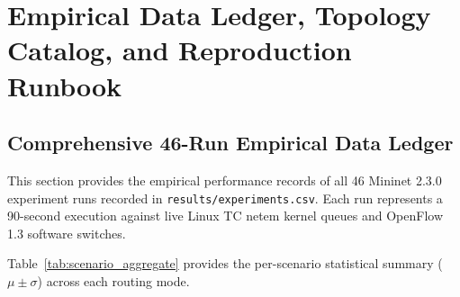 \chapter[Empirical Ledger, Topologies, and Runbook]{Empirical Data Ledger, Topology Catalog, and Reproduction Runbook}
\label{app:ledger_and_topologies}

\section{Comprehensive 46-Run Empirical Data Ledger}
This section provides the empirical performance records of all 46 Mininet 2.3.0 experiment runs recorded in \texttt{results/experiments.csv}. Each run represents a 90-second execution against live Linux TC netem kernel queues and OpenFlow 1.3 software switches.

Table~\ref{tab:scenario_aggregate} provides the per-scenario statistical summary ($\mu \pm \sigma$) across each routing mode.


